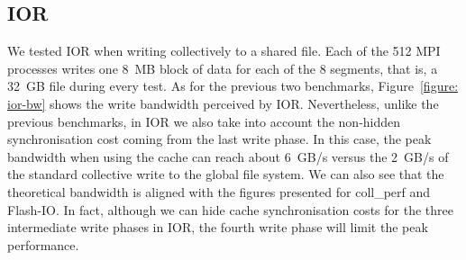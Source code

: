 \subsection{IOR}
\label{subsec: ior}
We tested IOR when writing collectively to a shared file. Each of the 512 MPI processes writes one 8~MB block of data for each of the 8 segments, that is, a 32~GB file during every test.
As for the previous two benchmarks, Figure~\ref{figure: ior-bw} shows the write bandwidth perceived by IOR. Nevertheless, unlike the previous benchmarks, in IOR we also take into account the non-hidden synchronisation cost coming from the last write phase. In this case, the peak bandwidth when using the cache can reach about 6~GB/s versus the 2~GB/s of the standard collective write to the global file system. We can also see that the theoretical bandwidth is aligned with the figures presented for coll\_perf and Flash-IO. In fact, although we can hide cache synchronisation costs for the three intermediate write phases in IOR, the fourth write phase will limit the peak performance.

